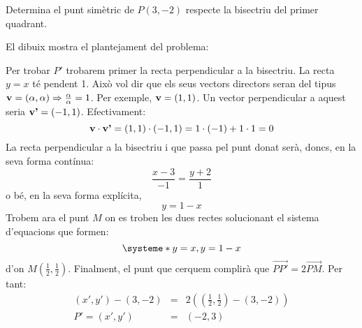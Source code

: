\Exercise Determina el punt simètric de $P(3,-2)$ respecte la bisectriu del primer quadrant.

\Answer 

El dibuix mostra el plantejament del problema:

\begin{center}
\end{center}

Per trobar $P'$ trobarem primer la recta perpendicular a la bisectriu. La recta $y=x$ té pendent 1. Això vol dir que els seus vectors directors seran del tipus $\textbf{v}=(\alpha,\alpha)\Rightarrow \frac{\alpha}{\alpha}=1$. Per exemple, $\textbf{v}=(1,1)$. Un vector perpendicular a aquest seria $\textbf{v'}=(-1,1)$. Efectivament:
\[
  \textbf{v}\cdot\textbf{v'}=(1,1)\cdot(-1,1)=1\cdot(-1)+1\cdot 1=0
\]
La recta perpendicular a la bisectriu i que passa pel punt donat serà, doncs, en la seva forma contínua:
\[\frac{x-3}{-1}=\frac{y+2}{1}\]
o bé, en la seva forma explícita,
\[y=1-x\]
Trobem ara el punt $M$ on es troben les dues rectes solucionant el sistema d'equacions que formen:
\[\systeme*{y=x,y=1-x}\]
d'on $M\left(\frac{1}{2},\frac{1}{2}\right)$.
Finalment, el punt que cerquem complirà que $\overrightarrow{PP'}=2\overrightarrow{PM}$. Per tant:
\begin{eqnarray*}
  (x',y')-(3,-2)&=&2\left(\left(\frac{1}{2},\frac{1}{2}\right)-(3,-2)\right)\\
  P'=(x',y')&=&(-2,3)
\end{eqnarray*}  